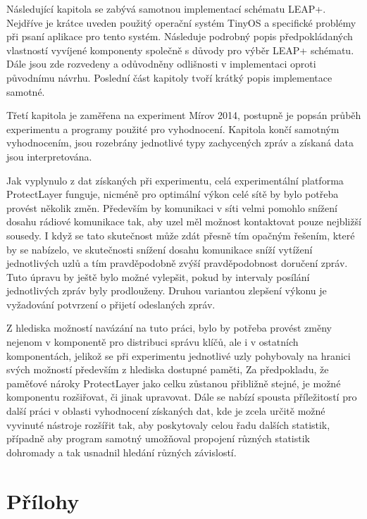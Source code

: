 \documentclass[11pt,final,twoside]{fithesis2}
\begin{document}
Následující kapitola se zabývá samotnou implementací schématu LEAP+. Nejdříve je krátce uveden použitý operační systém TinyOS a specifické problémy při psaní aplikace pro tento systém. Následuje podrobný 
popis předpokládaných vlastností vyvíjené komponenty společně s důvody pro výběr LEAP+ schématu. Dále jsou zde rozvedeny a odůvodněny odlišnosti v implementaci oproti původnímu návrhu. Poslední část kapitoly 
tvoří krátký popis implementace samotné. 

Třetí kapitola je zaměřena na experiment Mírov 2014, postupně je popsán průběh experimentu a programy použité pro vyhodnocení. Kapitola končí samotným vyhodnocením, jsou rozebrány jednotlivé typy zachycených 
zpráv a získaná data jsou interpretována. 

Jak vyplynulo z dat získaných při experimentu, celá experimentální platforma ProtectLayer funguje, nicméně pro optimální výkon celé sítě by bylo potřeba provést několik změn. Především by komunikaci v síti 
velmi pomohlo snížení dosahu rádiové komunikace tak, aby uzel měl možnost kontaktovat pouze nejbližší sousedy. I když se tato skutečnost může zdát přesně tím opačným řešením, které by se nabízelo, ve 
skutečnosti snížení dosahu komunikace sníží vytížení jednotlivých uzlů a tím pravděpodobně zvýší pravděpodobnost doručení zpráv. Tuto úpravu by ještě bylo možné vylepšit, pokud by intervaly posílání 
jednotlivých zpráv byly prodlouženy. Druhou variantou zlepšení výkonu je vyžadování potvrzení o přijetí odeslaných zpráv.

Z hlediska možností navázání na tuto práci, bylo by potřeba provést změny nejenom v komponentě pro distribuci správu klíčů, ale i v ostatních komponentách, jelikož se při experimentu jednotlivé uzly 
pohybovaly na hranici svých možností především z hlediska dostupné paměti, Za předpokladu, že paměťové nároky ProtectLayer jako celku zůstanou přibližně stejné, je možné komponentu rozšiřovat, či jinak 
upravovat. Dále se nabízí spousta příležitostí pro další práci v oblasti vyhodnocení získaných dat, kde je zcela určitě možné vyvinuté nástroje rozšířit 
tak, aby poskytovaly celou řadu dalších statistik, případně aby program samotný umožňoval propojení různých statistik dohromady a tak usnadnil hledání různých závislostí.


\appendix

\chapter{Přílohy}
\end{document}
